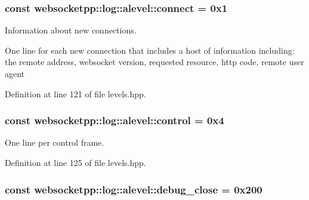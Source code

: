 \hypertarget{structwebsocketpp_1_1log_1_1alevel_aac3e16b6df297567ba2533233d477d57}{}
\subsubsection[{connect}]{ const websocketpp\+::log\+::alevel\+::connect = 0x1\hspace{0.3cm}{\ttfamily [static]}}\label{structwebsocketpp_1_1log_1_1alevel_aac3e16b6df297567ba2533233d477d57}


Information about new connections. 

One line for each new connection that includes a host of information including\+: the remote address, websocket version, requested resource, http code, remote user agent 

Definition at line 121 of file levels.\+hpp.

\hypertarget{structwebsocketpp_1_1log_1_1alevel_ae67e6466bf3d9daf45cc865e8d48f445}{}
\subsubsection[{control}]{ const websocketpp\+::log\+::alevel\+::control = 0x4\hspace{0.3cm}{\ttfamily [static]}}\label{structwebsocketpp_1_1log_1_1alevel_ae67e6466bf3d9daf45cc865e8d48f445}


One line per control frame. 



Definition at line 125 of file levels.\+hpp.

\hypertarget{structwebsocketpp_1_1log_1_1alevel_a8af43767d3814885f55495bf9f5f4df4}{}
\subsubsection[{debug\+\_\+close}]{ const websocketpp\+::log\+::alevel\+::debug\+\_\+close = 0x200\hspace{0.3cm}{\ttfamily [static]}}\label{structwebsocketpp_1_1log_1_1alevel_a8af43767d3814885f55495bf9f5f4df4}


